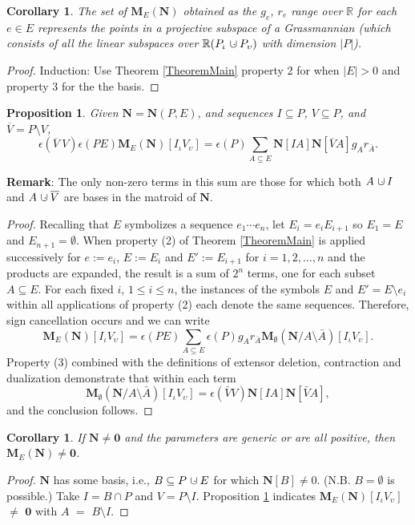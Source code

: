 \documentclass[12pt]{article}
\newtheorem{proposition}[theorem]{Proposition}
\newtheorem{corollary}[theorem]{Corollary}
\theoremstyle{definition}
\newcommand{\Remark}{\textbf{Remark}}
\newcommand{\dunion}
{\mbox{\hbox{\hskip6pt$\cdot$\hskip-5.50pt$\cup$\hskip2pt}}}
\newcommand{\scomp}[1]{\ensuremath{\overline{#1}}}
\newcommand{\scma}{\ensuremath{\ }}
\newcommand{\Is}{\ensuremath{\iota}}
\newcommand{\Vs}{\ensuremath{\upsilon}}
\newcommand{\Reals}{\ensuremath{\mathbb{R}}}
\newcommand{\Card}[1]{\ensuremath{{\left|#1\right|}}}
\newcommand{\ext}[1]{\ensuremath{\mathbf{#1}}}
\begin{document}
\begin{corollary}
The set of $\ext{M}_E(\ext{N})$ 
obtained as the $g_e$, $r_e$ range over $\Reals$ for
each $e\in E$ represents the points in a 
projective subspace of a Grassmannian 
(which consists of all the
linear subspaces over $\Reals (P_{\Is}\dunion P_{\Vs})$ 
with 
dimension $\Card{P}$).
\end{corollary}


\begin{proof}
Induction: Use Theorem \ref{TheoremMain} property 2 for when $|E|>0$ and 
property 3
for the the basis.
\end{proof}

\begin{proposition}Given $\ext{N}=\ext{N}(P,E)$,
and sequences $I\subseteq P$, $V\subseteq P$, and $\scomp{V}=P\setminus V$,
\label{PropositionMain}
\[
\epsilon(\scomp{V}\scma V)\epsilon(PE)\ext{M}_E(\ext{N})[I_{\Is}V_{\Vs}] = 
\epsilon(P)\sum_{A\subseteq E}\ext{N}[IA]\ext{N}
[\scomp{V}A]g_Ar_{\scomp{A}}.
\]
\end{proposition}
\Remark: The only non-zero terms in this sum are those for which both $A\dunion I$
and $A\dunion \scomp{V}$ are bases in the matroid of $\ext{N}$.

\begin{proof}
Recalling that $E$ symbolizes a sequence $e_1\cdots e_n$, 
let $E_{i}=e_iE_{i+1}$ so $E_1=E$ and $E_{n+1}=\emptyset$.
When property (2) of Theorem \ref{TheoremMain}
is applied successively for $e:=e_i$, $E:=E_i$ and
$E':=E_{i+1}$ for $i=1,2,\ldots,n$
and the products are expanded, the result is a sum
of $2^n$ terms, one for each subset $A\subseteq E$.
For each fixed $i$, $1\leq i\leq n$,
the instances of 
the symbols $E$ and $E'=E\setminus e_i$ within 
all applications of property (2) each denote the same sequences.
Therefore, sign cancellation occurs and we can write
\begin{equation}
\label{ExpansionFormula}
\ext{M}_E(\ext{N})[I_{\Is}V_{\Vs}] = \epsilon(PE)
\sum_{A\subseteq E}\epsilon(P)g_Ar_{\bar{A}}
\ext{M}_{\emptyset}(\ext{N}/A\setminus\bar{A})[I_{\Is}V_{\Vs}].
\end{equation}
Property (3) combined with the definitions of extensor deletion,
contraction and dualization demonstrate that within each term
\[
\ext{M}_{\emptyset}(\ext{N}/A\setminus\bar{A})[I_{\Is}V_{\Vs}]
=
\epsilon(\bar{V}V)\ext{N}[IA]\ext{N}[\bar{V}A],
\]
and the conclusion follows.
\end{proof}

\begin{corollary}
\label{MENisNonZero}
If $\ext{N}\neq\ext{0}$ and the parameters are generic or are all
positive, then $\ext{M}_E(\ext{N})\neq\ext{0}$.
\end{corollary}
\begin{proof}
$\ext{N}$ has some basis, i.e., $B\subseteq P\dunion E$ for which $\ext{N}[B]\neq 0$.
(N.B. $B=\emptyset$ is possible.)   Take $I=B\cap P$ and $V=P\setminus I$.
Proposition \ref{PropositionMain} indicates 
$\ext{M}_E(\ext{N})[I_\Is V_\Vs]$ $\neq$ $\ext{0}$ 
with $A$ $=$ $B\setminus I$.
\end{proof}
\end{document}
